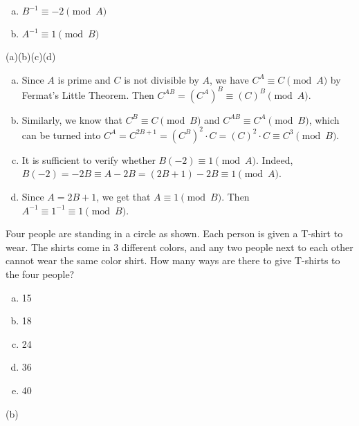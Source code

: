 \begin{solution}
\begin{enumerate}[(a)]
\begin{enumerate}[(a)]
	\item  $B^{-1}\equiv -2\pmod{A}$

	\item  $A^{-1}\equiv 1\pmod{B}$

\end{enumerate}
\begin{solution}

(a)(b)(c)(d)
\begin{enumerate}[(a)]
\item Since $A$ is prime and $C$ is not divisible by $A$, we have $C^{A}\equiv C\pmod{A}$ by Fermat’s Little Theorem. Then $C^{AB}=(C^{A})^B\equiv (C)^B\pmod{A}$.
\item Similarly, we know that $C^{B}\equiv C\pmod{B}$ and $C^{AB}\equiv C^A\pmod{B}$, which can be turned into $C^A=C^{2B+1}=(C^B)^2\cdot C =(C)^2\cdot C\equiv C^3\pmod{B}$.
\item It is sufficient to verify whether $B(-2)\equiv1\pmod{A}$. Indeed, $B(-2)=-2B\equiv A-2B=(2B+1)-2B\equiv1\pmod{A}$.
\item Since $A=2B+1$, we get that $A\equiv 1\pmod{B}$. Then $A^{-1}\equiv1^{-1}\equiv1\pmod{B}$.
\end{enumerate}

\end{solution}


Four people are standing in a circle as shown. Each person is given a T-shirt to wear.  The shirts come in 3 different colors, and any two people next to each other cannot wear the same color shirt. How many ways are there to give T-shirts to the four people?
\vspace{0.1in}

\begin{minipage}{.3\textwidth}
\begin{enumerate}[(a)]
	\item  15
    
	\item  18
    
	\item  24
    
	\item  36
    
	\item  40

\end{enumerate}
\begin{solution}


(b)


\end{solution}
\end{minipage}
\end{enumerate}
\end{solution}
